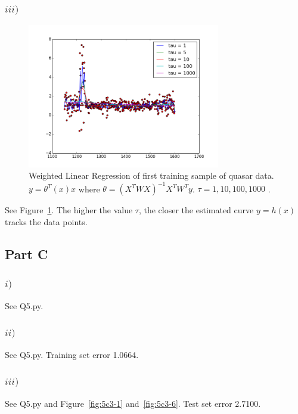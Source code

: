 \documentclass[11pt]{article}
\begin{document}
\subsubsection*{$iii)$}
\begin{figure}
	\centering
	\includegraphics[width=0.75\textwidth]{../p5b3.png}
	\caption{ Weighted Linear Regression of first training sample of quasar data. $y=\theta^T(x)x$ where $\theta=(X^TWX)^{-1}X^TW^Ty$. $\tau = 1,10,100,1000$ . }
	\label{fig:5b3}
\end{figure}

See Figure~\ref{fig:5b3}. The higher the value $\tau$, the closer the estimated curve $y=h(x)$ tracks
the data points. 

\subsection*{Part C}
\subsubsection*{$i)$}

See Q5.py.

\subsubsection*{$ii)$}

See Q5.py. Training set error 1.0664.

\subsubsection*{$iii)$}

See Q5.py and Figure~\ref{fig:5c3-1} and~\ref{fig:5c3-6}. Test set error 2.7100.
\end{document}
